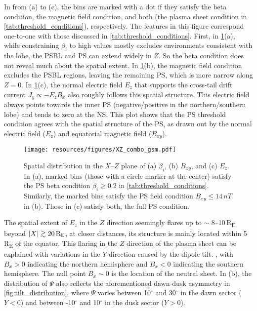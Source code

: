 \documentclass[draft]{agujournal2019}
\begin{document}
In  from (a) to (c), the bins are marked with a dot if they satisfy the beta condition, the magnetic field condition, and both (the plasma sheet condition in \cref{tab:threshold_conditions}), respectively. The features in this figure correspond one-to-one with those discussed in \cref{tab:threshold_conditions}. First, in \cref{fig:XZ}(a), while constraining $\beta_i$ to high values mostly excludes environments consistent with the lobe, the PSBL and PS can extend widely in $Z$. So the beta condition does not reveal much about the spatial extent. In \cref{fig:XZ}(b), the magnetic field condition excludes the PSBL regions, leaving the remaining PS, which is more narrow along ${Z=0}$. In \cref{fig:XZ}(c), the normal electric field $E_z$ that supports the cross-tail drift current ${J_y\propto-E_zB_x}$ also roughly follows this spatial structure. This electric field always points towards the inner PS (negative/positive in the northern/southern lobe) and tends to zero at the NS. This plot shows that the PS threshold condition agrees with the spatial structure of the PS, as drawn out by the normal electric field ($E_z$) and equatorial magnetic field ($B_{xy}$).

\begin{figure}
\centering
\noindent\texttt{[image: resources/figures/XZ\_combo\_gsm.pdf]}
\caption{
Spatial distribution in the $X$--$Z$ plane of (a) $\beta_i$, (b) $B_{xy}$, and (c) $E_z$. In (a), marked bins (those with a circle marker at the center) satisfy the PS beta condition ${\beta_i\geq0.2}$ in \cref{tab:threshold_conditions}. Similarly, the marked bins satisfy the PS field condition ${B_{xy}\leq 14\,\si{nT}}$ in (b). Those in (c) satisfy both, the full PS condition.
}
\label{fig:XZ}
\end{figure}

The spatial extent of $E_z$ in the $Z$ direction seemingly flares up to $\sim$ 8--10\,\si{R_E} beyond ${\abs{X}\gtrsim20\,\si{R_E}}$,  at closer distances, its structure is mainly located within 5\,\si{R_E} of the equator. This flaring in the $Z$ direction of the plasma sheet can be explained with variations in the $Y$ direction caused by the dipole tilt. , with ${B_x>0}$ indicating the northern hemisphere and ${B_x<0}$ indicating the southern hemisphere. The null point ${B_x\sim0}$ is the location of the neutral sheet. In (b), the distribution of $\Psi$ also reflects the aforementioned dawn-dusk asymmetry in \mbox{\cref{fig:tilt_distribution}}, where $\Psi$ varies between 10$^\circ$ and 30$^\circ$ in the dawn sector ($Y<0$) and between -10$^\circ$ and 10$^\circ$ in the dusk sector ($Y>0$).
\end{document}
